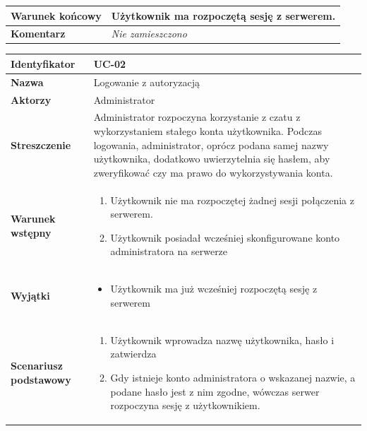 {\begin{tabularx}{\textwidth}{|l|X|}
	\hline
		\textbf{Warunek końcowy} &
			Użytkownik ma rozpoczętą sesję z serwerem.
		\\

	\hline
		\textbf{Komentarz} &
			\textit{Nie zamieszczono}
		\\

	\hline
\end{tabularx}

\vspace{2em}

\begin{tabularx}{\textwidth}{|l|X|}
	\hline
		\textbf{Identyfikator} &
		UC-02
		\\

	\hline
		\textbf{Nazwa} &
		Logowanie z autoryzacją
		\\

	\hline
		\textbf{Aktorzy} &
			Administrator
		\\

	\hline
		\textbf{Streszczenie} &
			Administrator rozpoczyna korzystanie z czatu z wykorzystaniem stałego
			konta użytkownika. Podczas logowania, administrator, oprócz podana samej
			nazwy użytkownika, dodatkowo uwierzytelnia się hasłem, aby zweryfikować
			czy ma prawo do wykorzystywania konta.
		\\

	\hline
		\textbf{Warunek wstępny} &
			\begin{enumerate}
				\item Użytkownik nie ma rozpoczętej żadnej sesji połączenia z serwerem.
				\item Użytkownik posiadał wcześniej skonfigurowane konto administratora
				na serwerze
			\end{enumerate}
		\\

	\hline
		\textbf{Wyjątki} &
			\begin{itemize}
				\item Użytkownik ma już wcześniej rozpoczętą sesję z serwerem
			\end{itemize}
		\\

	\hline
		\textbf{Scenariusz podstawowy} &
			\begin{enumerate}
				\item Użytkownik wprowadza nazwę użytkownika, hasło	i zatwierdza
				\item Gdy istnieje konto administratora o wskazanej nazwie, a podane
				hasło jest z nim zgodne, wówczas serwer rozpoczyna sesję z
				użytkownikiem.
			\end{enumerate}
		\\


\end{tabularx}}
